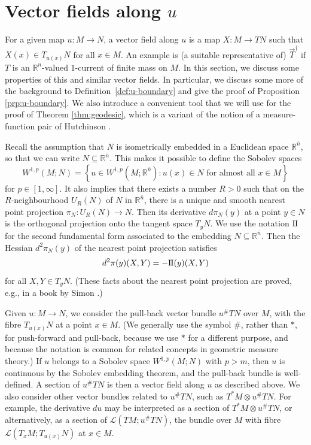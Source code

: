 \documentclass[a4paper]{article}
\newcommand{\R}{\mathbb{R}}
\newcommand{\ndim}{{\bar{n}}}
\newcommand{\Lin}{\mathcal{L}}
\newcommand{\sff}{\mathrm{I{\mkern -1mu}I}}
\newcommand{\set}[2]{\left\{ #1 \colon #2 \right\}}
\theoremstyle{definition}
\theoremstyle{remark}
\begin{document}
\section{Vector fields along $u$} \label{sct:vector-fields}

For a given map $u \colon M \to N$, a vector field along $u$ is a map
$X \colon M \to TN$ such that $X(x) \in T_{u(x)} N$ for all $x \in M$.
An example is (a suitable representative of) $\vec{T}^\dagger$ if
$T$ is an $\R^n$-valued $1$-current of finite mass on $M$.
In this section, we discuss some properties
of this and similar vector fields. In particular, we discuss some more of the
background to Definition~\ref{def:u-boundary} and give the proof of Proposition \ref{prp:u-boundary}. We also introduce a convenient tool that we will use for the proof of Theorem \ref{thm:geodesic},
which is a variant of the notion of a measure-function pair of Hutchinson \cite{Hutchinson:86}.

Recall the assumption that $N$ is isometrically embedded in a Euclidean space $\R^\ndim$, so that we can write $N \subseteq \R^\ndim$.
This makes it possible to define the Sobolev spaces
\[
W^{1, p}(M; N) = \set{u \in W^{1, p}(M; \R^\ndim)}{u(x) \in N \text{ for almost all } x \in M}
\]
for $p \in [1, \infty]$.
It also implies that there exists a number $R > 0$
such that on the $R$-neighbourhood $U_R(N)$ of $N$ in $\R^\ndim$,
there is a unique and smooth nearest point projection
$\pi_N \colon U_R(N) \to N$. Then its derivative $d\pi_N(y)$ at a point $y \in N$ is the orthogonal projection onto the tangent space $T_y N$.
We use the notation $\sff$ for the second fundamental form associated to the embedding $N \subseteq \R^\ndim$. Then the Hessian $d^2\pi_N(y)$ of the nearest point projection satisfies
\[
d^2\pi(y)(X, Y) = -\sff(y)(X, Y)
\]
for all $X, Y \in T_y N$. (These facts about the nearest point projection are proved, e.g., in a book by Simon \cite{Simon:96}.)

Given $u \colon M \to N$, we consider the pull-back vector bundle $u^\# TN$ over $M$, with the fibre $T_{u(x)} N$ at a point $x \in M$. (We generally use the symbol $\#$, rather than $*$, for push-forward and pull-back, because
we use $*$ for a different purpose, and because the notation is common for related concepts in geometric measure theory.)
If $u$ belongs to a Sobolev space $W^{1, p}(M; N)$ with $p > m$, then $u$
is continuous by the Sobolev embedding theorem, and the pull-back bundle is well-defined. A section of $u^\# TN$ is then a vector field along $u$ as described
above. We also consider other vector bundles related to $u^\# TN$, such as $T^* M \otimes u^\# TN$. For example, the derivative $du$ may be interpreted as a section
of $T^*M \otimes u^\# TN$, or alternatively, as a section of $\Lin(TM; u^\# TN)$,
the bundle over $M$ with fibre $\Lin(T_x M; T_{u(x)} N)$ at $x \in M$.
\end{document}
